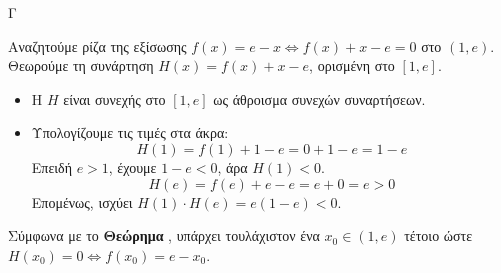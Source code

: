 \begin{thema}{Γ}
\begin{erwthma}
\item Αναζητούμε ρίζα της εξίσωσης $f(x) = e - x \Leftrightarrow f(x) + x - e = 0$ στο $(1, e)$.
Θεωρούμε τη συνάρτηση $H(x) = f(x) + x - e$, ορισμένη στο $[1, e]$.
\begin{itemize}
    \item Η $H$ είναι συνεχής στο $[1, e]$ ως άθροισμα συνεχών συναρτήσεων.
    \item Υπολογίζουμε τις τιμές στα άκρα:
    \[ H(1) = f(1) + 1 - e = 0 + 1 - e = 1 - e \]
    Επειδή $e > 1$, έχουμε $1 - e < 0$, άρα $H(1) < 0$.
    \[ H(e) = f(e) + e - e = e + 0 = e > 0 \]
    Επομένως, ισχύει $H(1) \cdot H(e) = e(1 - e) < 0$.
\end{itemize}
Σύμφωνα με το \textbf{Θεώρημα }, υπάρχει τουλάχιστον ένα $x_0 \in (1, e)$ τέτοιο ώστε $H(x_0) = 0 \Leftrightarrow f(x_0) = e - x_0$.
\end{erwthma}
\end{thema}

